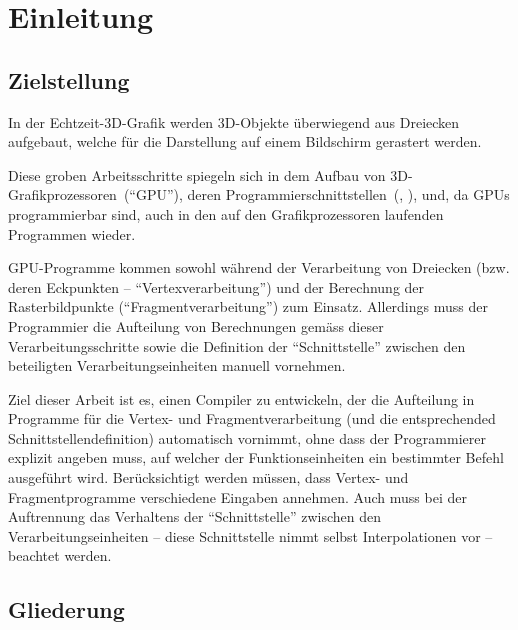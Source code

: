 \documentclass[twoside,a4paper,fleqn,12pt]{book}
\begin{document}
\chapter{Einleitung}

\section{Zielstellung}

In der Echtzeit-3D-Grafik werden 3D-Objekte überwiegend aus Dreiecken aufgebaut, welche für die Darstellung
auf einem Bildschirm gerastert werden.

Diese groben Arbeitsschritte spiegeln sich in dem Aufbau von 3D-Grafikprozessoren~("`\gls{GPU}"'),
deren Programmierschnittstellen~(\cite{glspec4}, \cite{dx10}), und, da GPUs programmierbar sind,
auch in den auf den Grafikprozessoren laufenden Programmen wieder.

GPU-Programme  kommen sowohl während der Verarbeitung von Dreiecken (bzw. deren Eckpunkten -- "`Vertexverarbeitung"') 
und der Berechnung der Rasterbildpunkte ("`Fragmentverarbeitung"') zum Einsatz.
Allerdings muss der Programmier die Aufteilung von Berechnungen gemäss dieser Verarbeitungsschritte sowie die Definition der "`Schnittstelle"'
zwischen den beteiligten Verarbeitungseinheiten manuell vornehmen.

Ziel dieser Arbeit ist es, einen Compiler zu entwickeln, der die Aufteilung in Programme für die Vertex- und Fragmentverarbeitung
(und die entsprechended Schnittstellendefinition) automatisch vornimmt,
ohne dass der Programmierer explizit angeben muss, auf welcher der Funktionseinheiten ein bestimmter Befehl ausgeführt wird.
Berücksichtigt werden müssen, dass Vertex- und Fragmentprogramme verschiedene Eingaben annehmen.
Auch muss bei der Auftrennung das Verhaltens der "`Schnittstelle"' zwischen den Verarbeitungseinheiten --
diese Schnittstelle nimmt selbst Interpolationen vor -- beachtet werden.


\section{Gliederung}
\end{document}
